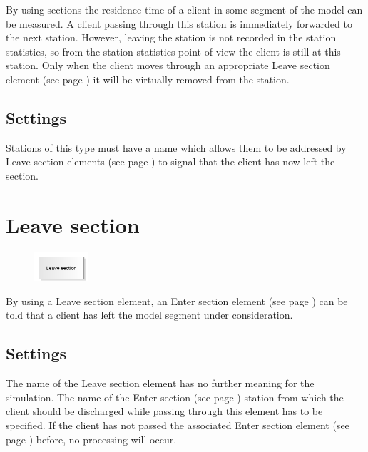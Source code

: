 By using sections the residence time of a client in some segment of the model can be measured.
A client passing through this station is immediately forwarded to the next station.
However, leaving the station is not recorded in the station statistics, so from the station
statistics point of view the client is still at this station. Only when the client moves through
an appropriate Leave section element (see page \pageref{ref:ModelElementSectionEnd}) it will be
virtually removed from the station.

\subsection*{Settings}

Stations of this type must have a name which allows them to be addressed by
Leave section elements (see page \pageref{ref:ModelElementSectionEnd}) to signal
that the client has now left the section.


\section{Leave section}
\label{ref:ModelElementSectionEnd}

\begin{figure}
\vspace{-22pt}
\includegraphics[width=2cm]{imageModelElementSectionEnd.png}
\vspace{-22pt}
\end{figure}

By using a Leave section element, an Enter section element (see page \pageref{ref:ModelElementSectionStart}) 
can be told that a client has left the model segment under consideration.

\subsection*{Settings}

The name of the Leave section element has no further meaning for the simulation.
The name of the Enter section (see page \pageref{ref:ModelElementSectionStart}) station
from which the client should be discharged while passing through this element has
to be specified. If the client has not passed the associated
Enter section element (see page \pageref{ref:ModelElementSectionStart}) before,
no processing will occur.


